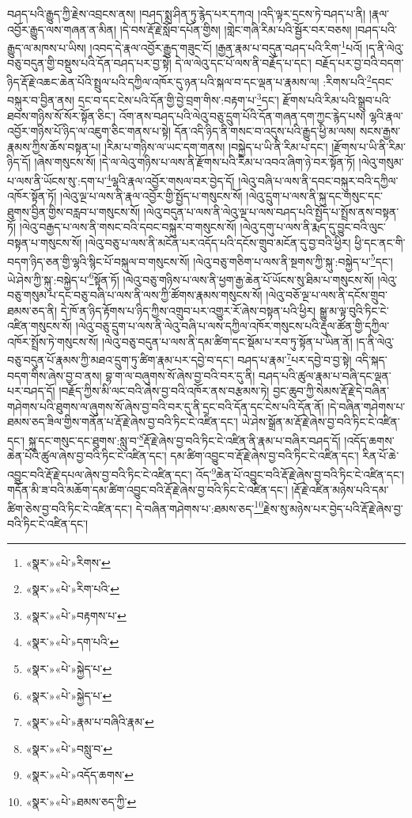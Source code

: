 བཤད་པའི་རྒྱུད་ཀྱི་རྗེས་འབྲངས་ནས། །བཤད་སྨྲ་ཤིན་ཏུ་རྙེད་པར་དཀའ། །འདི་ལྟར་དྲངས་ཏེ་བཤད་པ་ནི། །རྣལ་འབྱོར་རྒྱུད་ལས་གཞན་ན་མིན། །དེ་བས་རྡོ་རྗེ་སློབ་དཔོན་གྱིས། །གླེང་གཞི་རིམ་པའི་སྦྱོར་བར་བཅས། །བཤད་པའི་རྒྱུད་ལ་མཁས་པ་ཡིས། །འབད་དེ་རྣལ་འབྱོར་རྒྱུད་གཟུང་ངོ། །རྒྱན་རྣམ་པ་བདུན་བཤད་པའི་རིག་\footnote{«སྣར་»«པེ་»རིགས་}པའོ། །ད་ནི་ལེའུ་བཅུ་བདུན་གྱི་བསྡུས་པའི་དོན་བཤད་པར་བྱ་སྟེ། དེ་ལ་ལེའུ་དང་པོ་ལས་ནི་བརྗོད་པ་དང་། བརྗོད་པར་བྱ་བའི་བདག་ཉིད་རྡོ་རྗེ་འཆང་ཆེན་པོའི་སྤྲུལ་པའི་དཀྱིལ་འཁོར་དུ་ཉན་པའི་སྐལ་བ་དང་ལྡན་པ་རྣམས་ལ། :རིགས་པའི་\footnote{«སྣར་»«པེ་»རིག་པའི་}དབང་བསྐུར་བ་བྱིན་ནས། དྲང་བ་དང་ངེས་པའི་དོན་གྱི་བྱེ་བྲག་གིས་:བརྟག་པ་\footnote{«སྣར་»«པེ་»བརྟགས་པ་}དང་། རྫོགས་པའི་རིམ་པའི་སྒྲུབ་པའི་ཐབས་གཉིས་སོ་སོར་སྟོན་ཅིང་། འོག་ནས་བཤད་པའི་ལེའུ་བཅུ་དྲུག་པོའི་དོན་གཞན་དག་ཀྱང་རྙེད་པས། ལྷའི་རྣལ་འབྱོར་གཉིས་པོ་ཉིད་ལ་འཇུག་ཅིང་གནས་པ་སྟེ། དོན་འདི་ཉིད་ནི་གསང་བ་འདུས་པའི་རྒྱུད་ཕྱི་མ་ལས། སངས་རྒྱས་རྣམས་ཀྱིས་ཆོས་བསྟན་པ། །རིམ་པ་གཉིས་ལ་ཡང་དག་གནས། །བསྐྱེད་པ་ཡི་ནི་རིམ་པ་དང་། །རྫོགས་པ་ཡི་ནི་རིམ་ཉིད་དོ། །ཞེས་གསུངས་སོ། །དེ་ལ་ལེའུ་གཉིས་པ་ལས་ནི་རྫོགས་པའི་རིམ་པ་འབའ་ཞིག་ཉེ་བར་སྟོན་ཏོ། །ལེའུ་གསུམ་པ་ལས་ནི་ཡོངས་སུ་:དག་པ་\footnote{«སྣར་»«པེ་»དག་པའི་}ལྷའི་རྣལ་འབྱོར་གསལ་བར་བྱེད་དོ། །ལེའུ་བཞི་པ་ལས་ནི་དབང་བསྐུར་བའི་དཀྱིལ་འཁོར་སྟོན་ཏོ། །ལེའུ་ལྔ་པ་ལས་ནི་རྣལ་འབྱོར་གྱི་སྤྱོད་པ་གསུངས་སོ། །ལེའུ་དྲུག་པ་ལས་ནི་སྐུ་དང་གསུང་དང་ཐུགས་བྱིན་གྱིས་བརླབ་པ་གསུངས་སོ། །ལེའུ་བདུན་པ་ལས་ནི་ལེའུ་ལྔ་པ་ལས་བཤད་པའི་སྤྱོད་པ་སྤྲོས་ནས་བསྟན་ཏོ། །ལེའུ་བརྒྱད་པ་ལས་ནི་གསང་བའི་དབང་བསྐུར་བ་གསུངས་སོ། །ལེའུ་དགུ་པ་ལས་ནི་རྨད་དུ་བྱུང་བའི་ལུང་བསྟན་པ་གསུངས་སོ། །ལེའུ་བཅུ་པ་ལས་ནི་མངོན་པར་འདོད་པའི་དངོས་གྲུབ་མངོན་དུ་བྱ་བའི་ཕྱིར། ཕྱི་དང་ནང་གི་བདག་ཉིད་ཅན་གྱི་ལྷའི་སྙིང་པོ་བསྐུལ་བ་གསུངས་སོ། །ལེའུ་བཅུ་གཅིག་པ་ལས་ནི་སྔགས་ཀྱི་སྐུ་:བསྐྱེད་པ་\footnote{«སྣར་»«པེ་»སྐྱེད་པ་}དང་། ཡེ་ཤེས་ཀྱི་སྐུ་:བསྐྱེད་པ་\footnote{«སྣར་»«པེ་»སྐྱེད་པ་}སྟོན་ཏོ། །ལེའུ་བཅུ་གཉིས་པ་ལས་ནི་ཕྱག་རྒྱ་ཆེན་པོ་ཡོངས་སུ་ཐིམ་པ་གསུངས་སོ། །ལེའུ་བཅུ་གསུམ་པ་དང་བཅུ་བཞི་པ་ལས་ནི་ལས་ཀྱི་ཚོགས་རྣམས་གསུངས་སོ། །ལེའུ་བཅོ་ལྔ་པ་ལས་ནི་དངོས་གྲུབ་ཐམས་ཅད་ནི། དེ་ཁོ་ན་ཉིད་རྟོགས་པ་ཉིད་ཀྱིས་འགྲུབ་པར་འགྱུར་རོ་ཞེས་བསྟན་པའི་ཕྱིར། སྒྱུ་མ་ལྟ་བུའི་ཏིང་ངེ་འཛིན་གསུངས་སོ། །ལེའུ་བཅུ་དྲུག་པ་ལས་ནི་ལེའུ་བཞི་པ་ལས་དཀྱིལ་འཁོར་གསུངས་པའི་རྡུལ་ཚོན་གྱི་དཀྱིལ་འཁོར་སྤྲོས་ཏེ་གསུངས་སོ། །ལེའུ་བཅུ་བདུན་པ་ལས་ནི་དམ་ཚིག་དང་སྡོམ་པ་རབ་ཏུ་སྟོན་པ་ཡིན་ནོ། །ད་ནི་ལེའུ་བཅུ་བདུན་པོ་རྣམས་ཀྱི་མཐའ་དྲུག་ཏུ་ཚིག་རྣམ་པར་དབྱེ་བ་དང་། བཤད་པ་རྣམ་\footnote{«སྣར་»«པེ་»རྣམ་པ་བཞིའི་རྣམ་}པར་དབྱེ་བ་བྱ་སྟེ། འདི་སྐད་བདག་གིས་ཞེས་བྱ་བ་ནས། བྷ་ག་ལ་བཞུགས་སོ་ཞེས་བྱ་བའི་བར་དུ་ནི། བཤད་པའི་ཚུལ་རྣམ་པ་བཞི་དང་ལྡན་པར་བཤད་དོ། །བརྗོད་ཀྱིས་མི་ལང་བའི་ཞེས་བྱ་བའི་འཁོར་ནས་བརྩམས་ཏེ། བྱང་ཆུབ་ཀྱི་སེམས་རྡོ་རྗེ་དེ་བཞིན་གཤེགས་པའི་ཐུགས་ལ་ཞུགས་སོ་ཞེས་བྱ་བའི་བར་དུ་ནི་དྲང་བའི་དོན་དང་ངེས་པའི་དོན་ནོ། །དེ་བཞིན་གཤེགས་པ་ཐམས་ཅད་ཟིལ་གྱིས་གནོན་པ་རྡོ་རྗེ་ཞེས་བྱ་བའི་ཏིང་ངེ་འཛིན་དང་། ཡེ་ཤེས་སྒྲོན་མ་རྡོ་རྗེ་ཞེས་བྱ་བའི་ཏིང་ངེ་འཛིན་དང་། སྐུ་དང་གསུང་དང་ཐུགས་:སླུ་བ་\footnote{«སྣར་»«པེ་»བསླུ་བ་}རྡོ་རྗེ་ཞེས་བྱ་བའི་ཏིང་ངེ་འཛིན་ནི་རྣམ་པ་བཞིར་བཤད་དོ། །འདོད་ཆགས་ཆེན་པོའི་ཚུལ་ཞེས་བྱ་བའི་ཏིང་ངེ་འཛིན་དང་། དམ་ཚིག་འབྱུང་བ་རྡོ་རྗེ་ཞེས་བྱ་བའི་ཏིང་ངེ་འཛིན་དང་། རིན་པོ་ཆེ་འབྱུང་བའི་རྡོ་རྗེ་དཔལ་ཞེས་བྱ་བའི་ཏིང་ངེ་འཛིན་དང་། འོད་\footnote{«སྣར་»«པེ་»འདོད་ཆགས་}ཆེན་པོ་འབྱུང་བའི་རྡོ་རྗེ་ཞེས་བྱ་བའི་ཏིང་ངེ་འཛིན་དང་། གདོན་མི་ཟ་བའི་མཆོག་དམ་ཚིག་འབྱུང་བའི་རྡོ་རྗེ་ཞེས་བྱ་བའི་ཏིང་ངེ་འཛིན་དང་། །རྡོ་རྗེ་འཛིན་མཉེས་པའི་དམ་ཚིག་ཅེས་བྱ་བའི་ཏིང་ངེ་འཛིན་དང་། དེ་བཞིན་གཤེགས་པ་:ཐམས་ཅད་\footnote{«སྣར་»«པེ་»ཐམས་ཅད་ཀྱི་}རྗེས་སུ་མཉེས་པར་བྱེད་པའི་རྡོ་རྗེ་ཞེས་བྱ་བའི་ཏིང་ངེ་འཛིན་དང་། 
